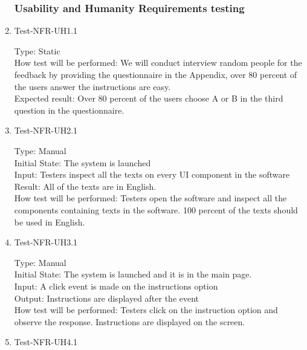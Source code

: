 \documentclass[12pt, titlepage]{article}
\begin{document}
\begin{enumerate}
\subsubsection{Usability and Humanity Requirements testing}
\item{Test-NFR-UH1.1\\}

Type: Static\\

How test will be performed:  We will conduct interview random people for the feedback by providing the questionnaire in the Appendix, over 80 percent of the users answer the instructions are easy.\\

Expected result: Over 80 percent of the users choose A or B in the third question in the questionnaire.

\item{Test-NFR-UH2.1\\}

Type: Manual\\

Initial State: The system is launched\\

Input: Testers inspect all the texts on every UI component in the software \\

Result: All of the texts are in English.\\

How test will be performed: Testers open the software and inspect all the components containing texts in the software. 100 percent of the texts should be used in English.

\item{Test-NFR-UH3.1\\}

Type: Manual\\

Initial State: The system is launched and it is in the main page.\\

Input: A click event is made on the instructions option\\

Output: Instructions are displayed after the event\\

How test will be performed: Testers click on the instruction option and observe the response. Instructions are displayed on the screen.

\item{Test-NFR-UH4.1\\}


\end{enumerate}
\end{document}
